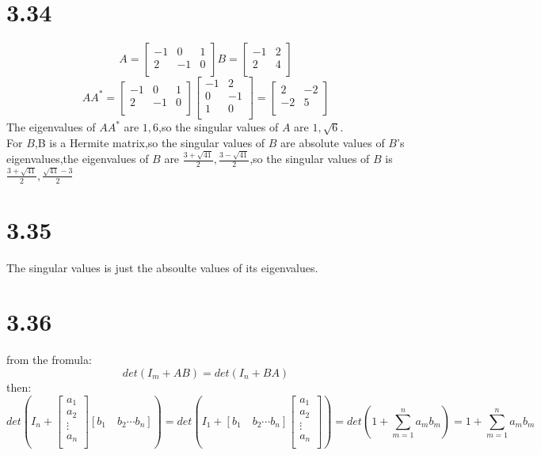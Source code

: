 \documentclass{article}
\begin{document}
\section*{3.34}
\[A=
\left[
\begin{array}{ccc}
-1 & 0 & 1\\
2 & -1 & 0\\
\end{array}
\right]
B=
\left[
\begin{array}{cc}
-1 & 2 \\
2 & 4\\
\end{array}
\right]
\]
\[AA^{*}=
\left[
\begin{array}{ccc}
-1 & 0 & 1\\
2 & -1 & 0\\
\end{array}
\right]
\left[
\begin{array}{cc}
-1 &2\\
0 & -1\\
1 & 0\\
\end{array}
\right]
=
\left[
\begin{array}{cc}
2 &-2\\
-2& 5\\
\end{array}
\right]
\]
The eigenvalues of $AA^{*}$ are $1,6$,so the singular values of $A$ are $1,\sqrt{6}$.\\
For $B$,B is a Hermite matrix,so the singular values of $B$ are absolute values of $B$'s eigenvalues,the eigenvalues of $B$ are $\frac{3+\sqrt{41}}{2},\frac{3-\sqrt{41}}{2}$,so the singular values of $B$ is 
$\frac{3+\sqrt{41}}{2},\frac{\sqrt{41}-3}{2}$

\section*{3.35}
The singular values is just the absoulte values of its eigenvalues.

\section*{3.36}
from the fromula:
\[det(I_m+AB)=det(I_n+BA)\]
then:
\[
det(I_n+
\left[
\begin{array}{c}
a_1\\
a_2\\
\vdots\\
a_n\\
\end{array}
\right]
[b_1 \quad b_2 \cdots b_n]
)
= 
det(I_1+
[b_1 \quad b_2 \cdots b_n]
\left[
\begin{array}{c}
a_1\\
a_2\\
\vdots\\
a_n\\
\end{array}
\right]
)
=det(1+
\sum_{m=1}^{n}a_mb_m
)=
1+\sum_{m=1}^{n}a_mb_m
\]
\end{document}

